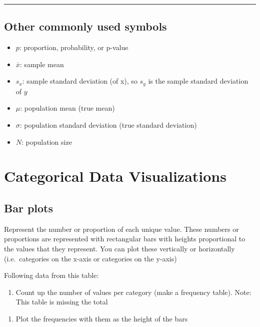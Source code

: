 \documentclass[
]{book}
\providecommand{\tightlist}{%
  \setlength{\itemsep}{0pt}\setlength{\parskip}{0pt}}
\theoremstyle{definition}
\theoremstyle{definition}
\theoremstyle{definition}
\theoremstyle{definition}
\theoremstyle{remark}
\begin{document}
\begin{center}\rule{0.5\linewidth}{0.5pt}\end{center}

\hypertarget{other-commonly-used-symbols}{%
\section{Other commonly used symbols}\label{other-commonly-used-symbols}}

\begin{itemize}
\item
  \(p\): proportion, probability, or p-value
\item
  \(\bar x\): sample mean
\item
  \(s_x\): sample standard deviation (of x), so \(s_y\) is the sample
  standard deviation of \(y\)
\item
  \(\mu\): population mean (true mean)
\item
  \(\sigma\): population standard deviation (true standard deviation)
\item
  \(N\): population size
\end{itemize}

\hypertarget{categorical-data-visualizations}{%
\chapter{Categorical Data Visualizations}\label{categorical-data-visualizations}}

\hypertarget{bar-plots}{%
\section{Bar plots}\label{bar-plots}}

Represent the number or proportion of each unique value. These numbers
or proportions are represented with rectangular bars with heights
proportional to the values that they represent. You can plot these
vertically or horizontally (i.e.~categories on the x-axis or categories
on the y-axis)

Following data from this table:

\begin{enumerate}
\def\labelenumi{\arabic{enumi}.}
\tightlist
\item
  Count up the number of values per category (make a frequency table).
  Note: This table is missing the total
\end{enumerate}

\begin{enumerate}
\def\labelenumi{\arabic{enumi}.}
\setcounter{enumi}{1}
\tightlist
\item
  Plot the frequencies with them as the height of the bars
\end{enumerate}
\end{document}

